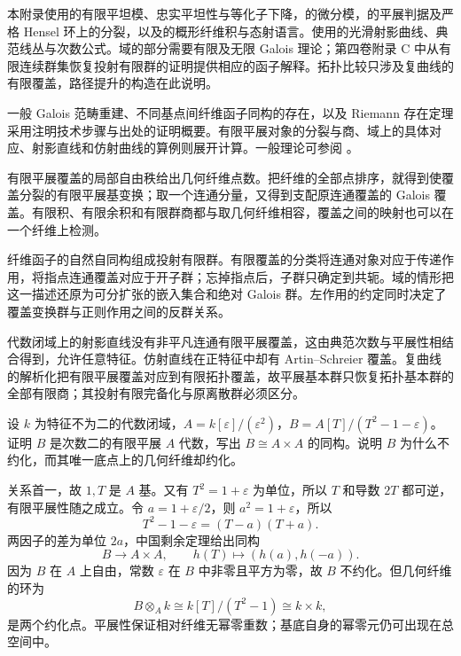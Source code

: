 \ProseParagraphBreak
本附录使用的有限平坦模、忠实平坦性与等化子下降，的微分模，的平展判据及严格 Hensel 环上的分裂，以及的概形纤维积与态射语言。使用的光滑射影曲线、典范线丛与次数公式。域的部分需要有限及无限 Galois 理论；第四卷附录 C 中从有限连续群集恢复投射有限群的证明提供相应的函子解释。拓扑比较只涉及复曲线的有限覆盖，路径提升的构造在此说明。

\ProseParagraphBreak
一般 Galois 范畴重建、不同基点间纤维函子同构的存在，以及 Riemann 存在定理采用注明技术步骤与出处的证明概要。有限平展对象的分裂与商、域上的具体对应、射影直线和仿射曲线的算例则展开计算。一般理论可参阅 \cite[Exposés V and XII]{SGA12003}。





\begin{chaptersummary}
	有限平展覆盖的局部自由秩给出几何纤维点数。把纤维的全部点排序，就得到使覆盖分裂的有限平展基变换；取一个连通分量，又得到支配原连通覆盖的 Galois 覆盖。有限积、有限余积和有限群商都与取几何纤维相容，覆盖之间的映射也可以在一个纤维上检测。

	\ProseParagraphBreak
	纤维函子的自然自同构组成投射有限群。有限覆盖的分类将连通对象对应于传递作用，将指点连通覆盖对应于开子群；忘掉指点后，子群只确定到共轭。域的情形把这一描述还原为可分扩张的嵌入集合和绝对 Galois 群。左作用的约定同时决定了覆盖变换群与正则作用之间的反群关系。

	\ProseParagraphBreak
	代数闭域上的射影直线没有非平凡连通有限平展覆盖，这由典范次数与平展性相结合得到，允许任意特征。仿射直线在正特征中却有 Artin–Schreier 覆盖。复曲线的解析化把有限平展覆盖对应到有限拓扑覆盖，故平展基本群只恢复拓扑基本群的全部有限商；其投射有限完备化与原离散群必须区分。
\end{chaptersummary}

\BookExercises

\begin{exercise}\label{b3:ex:I-nonreduced-base}
	设 \(k\) 为特征不为二的代数闭域，\(A=k[\varepsilon]/(\varepsilon^2)\)，\(B=A[T]/(T^2-1-\varepsilon)\)。证明 \(B\) 是次数二的有限平展 \(A\) 代数，写出 \(B\cong A\times A\) 的同构。说明 \(B\) 为什么不约化，而其唯一底点上的几何纤维却约化。
\end{exercise}
\begin{solution}
	关系首一，故 \(1,T\) 是 \(A\) 基。又有 \(T^2=1+\varepsilon\) 为单位，所以 \(T\) 和导数 \(2T\) 都可逆，有限平展性随之成立。令 \(a=1+\varepsilon/2\)，则 \(a^2=1+\varepsilon\)，所以
	\[
		T^2-1-\varepsilon=(T-a)(T+a).
	\]
	两因子的差为单位 \(2a\)，中国剩余定理给出同构
	\[
		B\longrightarrow A\times A,\qquad h(T)\longmapsto(h(a),h(-a)).
	\]
	因为 \(B\) 在 \(A\) 上自由，常数 \(\varepsilon\) 在 \(B\) 中非零且平方为零，故 \(B\) 不约化。但几何纤维的环为
	\[
		B\otimes_A k\cong k[T]/(T^2-1)\cong k\times k,
	\]
	是两个约化点。平展性保证相对纤维无幂零重数；基底自身的幂零元仍可出现在总空间中。
\end{solution}

